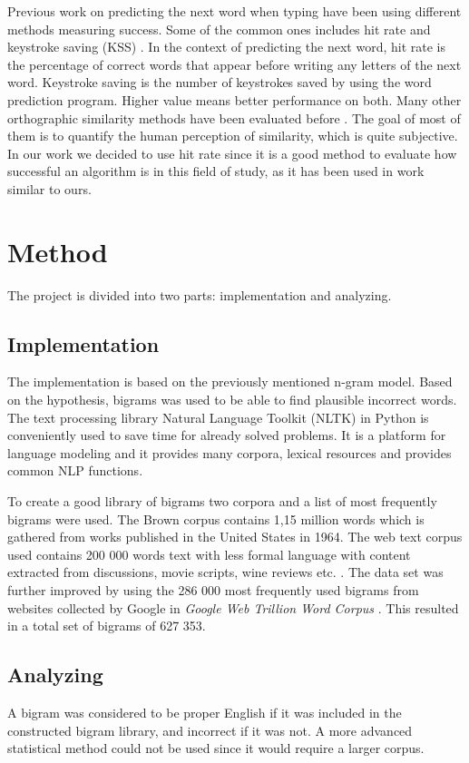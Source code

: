 \documentclass[a4paper,12pt]{article}
\begin{document}
Previous work on predicting the next word when typing have been using different methods measuring success. Some of the common ones includes hit rate and keystroke saving (KSS) \cite{ghayoomi2005word}. In the context of predicting the next word, hit rate is the percentage of correct words that appear before writing any letters of the next word. Keystroke saving is the number of keystrokes saved by using the word prediction program.  Higher value means better performance on both. Many other orthographic similarity methods have been evaluated before \cite{frunza2006automatic}. The goal of most of them is to quantify the human perception of similarity, which is quite subjective. In our work we decided to use hit rate since it is a good method to evaluate how successful an algorithm is in this field of study, as it has been used in work similar to ours. 

\section{Method}
\label{sec:method}
The project is divided into two parts: implementation and analyzing.

\subsection{Implementation}
\label{ref:implementation}
The implementation is based on the previously mentioned n-gram model. Based on the hypothesis, bigrams was used to be able to find plausible incorrect words. The text processing library Natural Language Toolkit (NLTK) in Python is conveniently used to save time for already solved problems. It is a platform for language modeling and it provides many corpora, lexical resources and provides common NLP functions\cite{loper2002nltk}. 

To create a good library of bigrams  two corpora and a list of most frequently bigrams were used.  The Brown corpus contains 1,15 million words which is gathered from works published in the United States in 1964\cite{francis64brown}. The web text corpus used contains 200 000 words text with less formal language with content extracted from discussions, movie scripts, wine reviews etc. \cite{nltkWebtext}. The data set was further improved by using the 286 000 most frequently used bigrams from websites collected by Google in \emph{Google Web Trillion Word Corpus} \cite{google}.  This resulted in a total set of bigrams of 627 353. 

\subsection{Analyzing}
\label{ref:analyzing}
A bigram was considered to be proper English if it was included in the constructed bigram library, and incorrect if it was not. A more advanced statistical method could not be used since it would require a larger corpus. 
\end{document}
